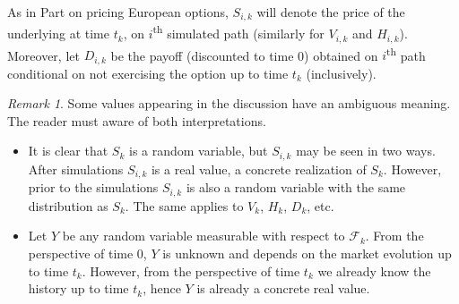 \documentclass[a4paper,11pt, twoside]{book}
\theoremstyle{definition}
\theoremstyle{remark}
\newtheorem{remark}{Remark}[chapter]
\begin{document}
As in Part on pricing European options, $S_{i,k}$ will denote the price of the underlying at time $t_k$, on $i$\textsuperscript{th} simulated path (similarly for $V_{i,k}$ and $H_{i,k}$). Moreover, let $D_{i,k}$ be the payoff (discounted to time 0) obtained on $i$\textsuperscript{th} path conditional on not exercising the option up to time $t_k$ (inclusively).
\begin{remark}
  Some values appearing in the discussion have an ambiguous meaning. The reader must aware of both interpretations.
 \begin{itemize}
  \item It is clear that $S_{k}$ is a random variable, but $S_{i,k}$ may be seen in two ways. After simulations $S_{i,k}$ is a real value, a concrete realization of $S_{k}$. However, prior to the simulations $S_{i,k}$ is also a random variable with the same distribution as $S_k$. The same applies to  $V_k$, $H_k$, $D_k$, etc.
  \item Let $Y$ be any random variable measurable with respect to $\mathcal{F}_k$. From the perspective of time 0, $Y$ is unknown and depends on the market evolution up to time $t_k$. However, from the perspective of time $t_k$ we already know the history up to time $t_k$, hence $Y$ is already a concrete real value.
 \end{itemize}
\end{remark}
\end{document}

